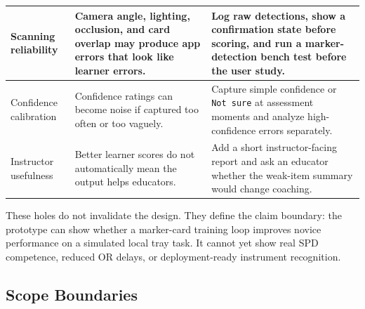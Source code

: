 \documentclass[10pt,a4paper]{article}
\begin{document}
\begin{table}[H]
\begin{tabularx}{\textwidth}{|>{\raggedright\arraybackslash}X|>{\raggedright\arraybackslash}X|>{\raggedright\arraybackslash}X|}
\hline
Scanning reliability & Camera angle, lighting, occlusion, and card overlap may produce app errors that look like learner errors. & Log raw detections, show a confirmation state before scoring, and run a marker-detection bench test before the user study. \\
\hline
Confidence calibration & Confidence ratings can become noise if captured too often or too vaguely. & Capture simple confidence or \texttt{Not sure} at assessment moments and analyze high-confidence errors separately. \\
\hline
Instructor usefulness & Better learner scores do not automatically mean the output helps educators. & Add a short instructor-facing report and ask an educator whether the weak-item summary would change coaching. \\
\hline
\end{tabularx}
\end{table}
These holes do not invalidate the design. They define the claim boundary: the
prototype can show whether a marker-card training loop improves novice
performance on a simulated local tray task. It cannot yet show real SPD
competence, reduced OR delays, or deployment-ready instrument recognition.
\subsection{Scope Boundaries}
\end{document}

